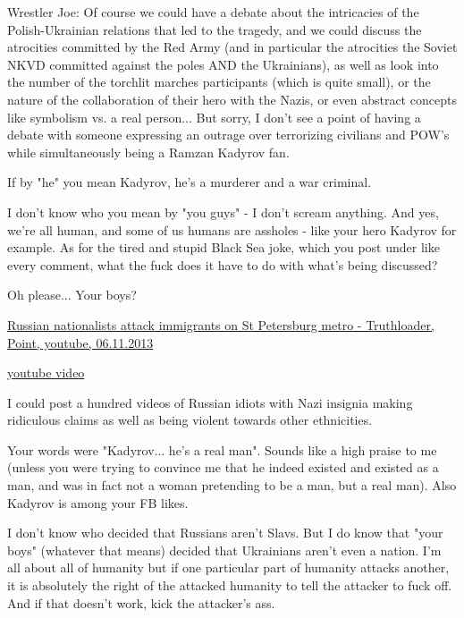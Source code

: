 \begin{itemize}
\begin{itemize} %

Wrestler Joe: Of course we could have a debate about the intricacies of the
Polish-Ukrainian relations that led to the tragedy, and we could discuss the
atrocities committed by the Red Army (and in particular the atrocities the
Soviet NKVD committed against the poles AND the Ukrainians), as well as look
into the number of the torchlit marches participants (which is quite small), or
the nature of the collaboration of their hero with the Nazis, or even abstract
concepts like symbolism vs. a real person... But sorry, I don't see a point of
having a debate with someone expressing an outrage over terrorizing civilians
and POW's while simultaneously being a Ramzan Kadyrov fan.


If by "he" you mean Kadyrov, he's a murderer and a war criminal.


I don't know who you mean by "you guys" - I don't scream anything. And yes,
we're all human, and some of us humans are assholes - like your hero Kadyrov
for example. As for the tired and stupid Black Sea joke, which you post under
like every comment, what the fuck does it have to do with what's being
discussed?

Oh please... Your boys? 

\href{https://www.youtube.com/watch?v=klkyfbnS0TA}{%
Russian nationalists attack immigrants on St Petersburg metro - Truthloader, Point, youtube, 06.11.2013%
}


\href{https://www.youtube.com/watch?v=zOZXxujwBic}{%
youtube video%
}


I could post a hundred videos of Russian idiots with Nazi insignia making
ridiculous claims as well as being violent towards other ethnicities.

Your words were "Kadyrov... he's a real man". Sounds like a high praise to me
(unless you were trying to convince me that he indeed existed and existed as a
man, and was in fact not a woman pretending to be a man, but a real man). Also
Kadyrov is among your FB likes.

I don't know who decided that Russians aren't Slavs. But I do know that "your
boys" (whatever that means) decided that Ukrainians aren't even a nation. I'm
all about all of humanity but if one particular part of humanity attacks
another, it is absolutely the right of the attacked humanity to tell the
attacker to fuck off. And if that doesn't work, kick the attacker's ass.


\end{itemize}
\end{itemize}
